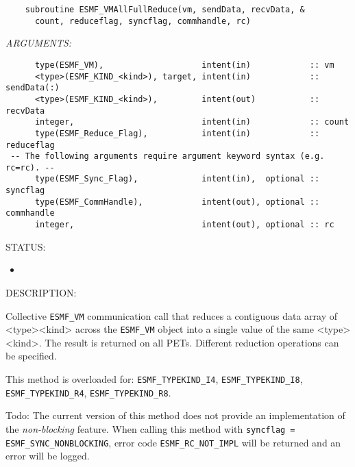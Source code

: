   
\begin{verbatim}    subroutine ESMF_VMAllFullReduce(vm, sendData, recvData, &
      count, reduceflag, syncflag, commhandle, rc)\end{verbatim}{\em ARGUMENTS:}
\begin{verbatim}      type(ESMF_VM),                    intent(in)            :: vm
      <type>(ESMF_KIND_<kind>), target, intent(in)            :: sendData(:)
      <type>(ESMF_KIND_<kind>),         intent(out)           :: recvData
      integer,                          intent(in)            :: count
      type(ESMF_Reduce_Flag),           intent(in)            :: reduceflag
 -- The following arguments require argument keyword syntax (e.g. rc=rc). --
      type(ESMF_Sync_Flag),             intent(in),  optional :: syncflag
      type(ESMF_CommHandle),            intent(out), optional :: commhandle
      integer,                          intent(out), optional :: rc\end{verbatim}
{\sf STATUS:}
   \begin{itemize}
   \item{}
   \end{itemize}
  
{\sf DESCRIPTION:\\ }


     Collective {\tt ESMF\_VM} communication call that reduces a contiguous data 
     array of <type><kind> across the {\tt ESMF\_VM} object 
     into a single value of the same <type><kind>. The result is
     returned on all PETs. Different reduction operations can be specified.
  
     This method is overloaded for:
     {\tt ESMF\_TYPEKIND\_I4}, {\tt ESMF\_TYPEKIND\_I8},
     {\tt ESMF\_TYPEKIND\_R4}, {\tt ESMF\_TYPEKIND\_R8}.
  
     {\sc Todo:} The current version of this method does not provide an 
     implementation of the {\em non-blocking} feature. When calling this 
     method with {\tt syncflag = ESMF\_SYNC\_NONBLOCKING}, error code 
     {\tt ESMF\_RC\_NOT\_IMPL} will be returned and an error will be 
     logged.
  
